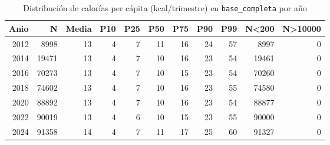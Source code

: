\begin{table}[ht]
\centering
\caption{Distribuci\'on de calor\'ias per c\'apita (kcal/trimestre) en \texttt{base\_completa} por a\~{n}o} 
\label{tab:10_kcal_pc_distribucion}
\begin{tabular}{rrrrrrrrrrr}
  \toprule
Anio & N & Media & P10 & P25 & P50 & P75 & P90 & P99 & N<200 & N>10000 \\ 
  \midrule
2012 & 8998 & 13 & 4 & 7 & 11 & 16 & 24 & 57 & 8997 & 0 \\ 
  2014 & 19471 & 13 & 4 & 7 & 10 & 16 & 23 & 54 & 19461 & 0 \\ 
  2016 & 70273 & 13 & 4 & 7 & 10 & 15 & 23 & 54 & 70260 & 0 \\ 
  2018 & 74602 & 13 & 4 & 7 & 10 & 16 & 23 & 55 & 74580 & 0 \\ 
  2020 & 88892 & 13 & 4 & 7 & 10 & 16 & 23 & 54 & 88877 & 0 \\ 
  2022 & 90019 & 13 & 4 & 6 & 10 & 15 & 23 & 55 & 90000 & 0 \\ 
  2024 & 91358 & 14 & 4 & 7 & 11 & 17 & 25 & 60 & 91327 & 0 \\ 
   \bottomrule
\end{tabular}
\end{table}
